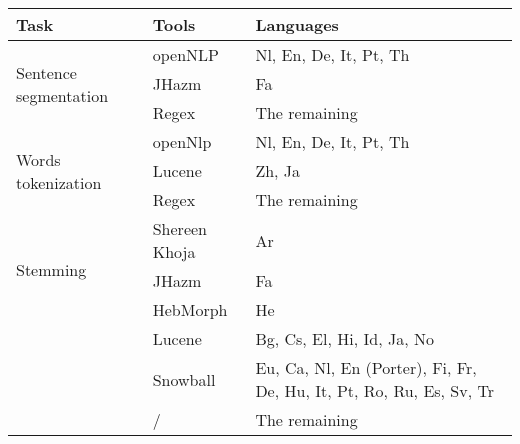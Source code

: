 \begin{tabular}{p{5.5cm}p{5cm}p{10cm}} 
\hline \hline
Task & Tools & Languages \\
\hline
\multirow{3}{2cm}{Sentence segmentation} & openNLP & Nl, En, De, It, Pt, Th \\
\cline{2-3}
& JHazm & Fa \\
\cline{2-3}
& Regex & The remaining \\
\hline
\multirow{3}{2cm}{Words tokenization} & openNlp & Nl, En, De, It, Pt, Th \\
\cline{2-3}
& Lucene & Zh, Ja \\
\cline{2-3}
& Regex & The remaining \\
\hline
\multirow{3}{2cm}{Stemming} & Shereen Khoja & Ar \\
\cline{2-3}
& JHazm & Fa \\
\cline{2-3}
& HebMorph & He \\
\cline{2-3}
& Lucene & Bg, Cs, El, Hi, Id, Ja, No \\
\cline{2-3}
& Snowball & Eu, Ca, Nl, En (Porter), Fi, Fr, De, Hu, It, Pt, Ro, Ru, Es, Sv, Tr \\
\cline{2-3}
& / & The remaining \\
\hline \hline
\end{tabular}
